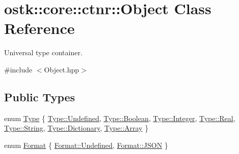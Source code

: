 \hypertarget{classostk_1_1core_1_1ctnr_1_1_object}{}\section{ostk\+:\+:core\+:\+:ctnr\+:\+:Object Class Reference}
\label{classostk_1_1core_1_1ctnr_1_1_object}


Universal type container.  




{\ttfamily \#include $<$Object.\+hpp$>$}

\subsection*{Public Types}
\begin{DoxyCompactItemize}
\item 
enum \hyperlink{classostk_1_1core_1_1ctnr_1_1_object_a49b70d4dce2d24126cd1df9aaf04d1ea}{Type} \{ \newline
\hyperlink{classostk_1_1core_1_1ctnr_1_1_object_a49b70d4dce2d24126cd1df9aaf04d1eaaec0fc0100c4fc1ce4eea230c3dc10360}{Type\+::\+Undefined}, 
\hyperlink{classostk_1_1core_1_1ctnr_1_1_object_a49b70d4dce2d24126cd1df9aaf04d1eaa27226c864bac7454a8504f8edb15d95b}{Type\+::\+Boolean}, 
\hyperlink{classostk_1_1core_1_1ctnr_1_1_object_a49b70d4dce2d24126cd1df9aaf04d1eaaa0faef0851b4294c06f2b94bb1cb2044}{Type\+::\+Integer}, 
\hyperlink{classostk_1_1core_1_1ctnr_1_1_object_a49b70d4dce2d24126cd1df9aaf04d1eaa7f80fcc452c2f1ed2bb51b39d0864df1}{Type\+::\+Real}, 
\newline
\hyperlink{classostk_1_1core_1_1ctnr_1_1_object_a49b70d4dce2d24126cd1df9aaf04d1eaa27118326006d3829667a400ad23d5d98}{Type\+::\+String}, 
\hyperlink{classostk_1_1core_1_1ctnr_1_1_object_a49b70d4dce2d24126cd1df9aaf04d1eaa3beb75d1563ebc22253341be4ce57f44}{Type\+::\+Dictionary}, 
\hyperlink{classostk_1_1core_1_1ctnr_1_1_object_a49b70d4dce2d24126cd1df9aaf04d1eaa4410ec34d9e6c1a68100ca0ce033fb17}{Type\+::\+Array}
 \}
\item 
enum \hyperlink{classostk_1_1core_1_1ctnr_1_1_object_a3266b14cf7e3df39858f6572120e3b24}{Format} \{ \hyperlink{classostk_1_1core_1_1ctnr_1_1_object_a3266b14cf7e3df39858f6572120e3b24aec0fc0100c4fc1ce4eea230c3dc10360}{Format\+::\+Undefined}, 
\hyperlink{classostk_1_1core_1_1ctnr_1_1_object_a3266b14cf7e3df39858f6572120e3b24a0ecd11c1d7a287401d148a23bbd7a2f8}{Format\+::\+J\+S\+ON}
 \}
\end{DoxyCompactItemize}
